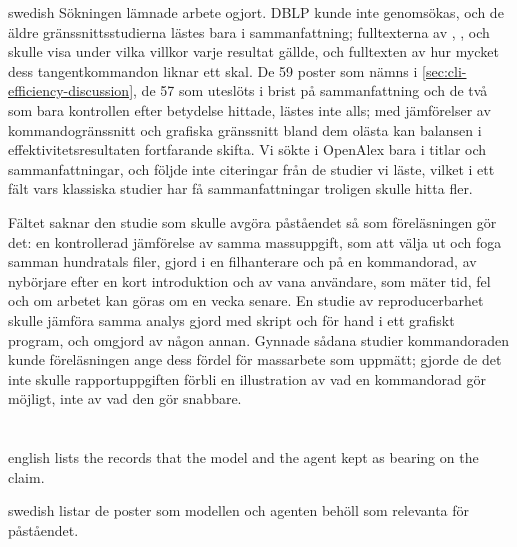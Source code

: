 \begin{onlyin}{swedish}
Sökningen lämnade arbete ogjort.  DBLP kunde inte genomsökas, och de
äldre gränssnittsstudierna lästes bara i sammanfattning; fulltexterna
av \textcite{Whiteside1985User}, \textcite{Antin1988Empirical},
\textcite{Durham1998Learning} och \textcite{Staggers2000Comparing}
skulle visa under vilka villkor varje resultat gällde, och fulltexten av
\textcite{Remington2016With} hur mycket dess tangentkommandon liknar ett
skal.  De 59 poster som nämns i \cref{sec:cli-efficiency-discussion},
de 57 som uteslöts i brist på sammanfattning och de två som bara
kontrollen efter betydelse hittade, lästes inte alls; med jämförelser av
kommandogränssnitt och grafiska gränssnitt bland dem olästa kan balansen
i effektivitetsresultaten fortfarande skifta.
Vi sökte i OpenAlex bara i titlar och sammanfattningar, och följde inte
citeringar från de studier vi läste, vilket i ett fält vars klassiska
studier har få sammanfattningar troligen skulle hitta fler.

Fältet saknar den studie som skulle avgöra påståendet så som
föreläsningen gör det: en kontrollerad jämförelse av samma massuppgift,
som att välja ut och foga samman hundratals filer, gjord i en
filhanterare och på en kommandorad, av nybörjare efter en kort
introduktion och av vana användare, som mäter tid, fel och om arbetet
kan göras om en vecka senare.  En studie av reproducerbarhet skulle jämföra
samma analys gjord med skript och för hand i ett grafiskt program, och
omgjord av någon annan.  Gynnade sådana studier kommandoraden kunde
föreläsningen ange dess fördel för massarbete som uppmätt; gjorde de det
inte skulle rapportuppgiften förbli en illustration av vad en
kommandorad gör möjligt, inte av vad den gör snabbare.
\end{onlyin}

\section{} %
\label{sec:cli-efficiency-hits}

\begin{onlyin}{english} %
 lists the records that the model and the agent
kept as bearing on the claim.
\end{onlyin}
\begin{onlyin}{swedish}
 listar de poster som modellen och agenten behöll
som relevanta för påståendet.
\end{onlyin}

